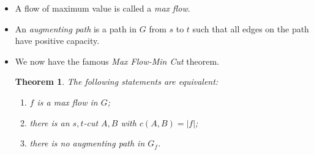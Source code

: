\documentclass[10pt]{article}
\newtheorem{theorem}[lemma]{Theorem}
\begin{document}
\begin{itemize}
\begin{proof}
          Now, $$|f \pm f'| = \sum_{v \in V} (f \pm f')(s, v) = \sum_{v \in V} (f(u,v) \pm f'(u,v))
          \sum_{v \in V} f(u,v) \pm \sum_{v \in V} f'(u,v) = |f| \pm |f'|.$$
          We are done with (b).
        \end{proof}
      \item A flow of maximum value is called a \emph{max flow}.
      \item An \emph{augmenting path} is a path in $G$ from $s$ to $t$ such
        that all edges on the path have positive capacity.
      \item We now have the famous \emph{Max Flow-Min Cut} theorem.
        \begin{theorem}
          The following statements are equivalent:
          \renewcommand{\labelenumi}{(\alph{enumi})}
          \begin{enumerate}
            \item $f$ is a max flow in $G$;
            \item there is an $s,t$-cut $A, B$ with $c(A,B) = |f|$;
            \item there is no augmenting path in $G_f$.
          \end{enumerate}
        \end{theorem}
    \end{itemize}
  
\end{document}
